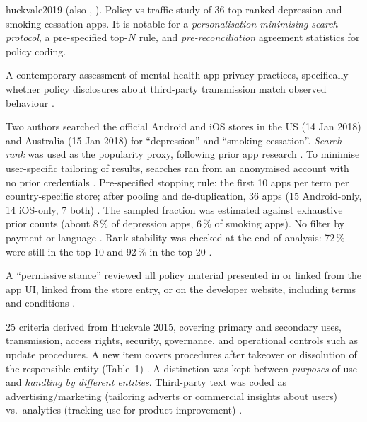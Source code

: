 \begin{papercard}{huckvale2019}
    (also , ). Policy-vs-traffic study of 36 top-ranked depression and smoking-cessation apps. It is notable for a \emph{personalisation-minimising search protocol}, a pre-specified top-$N$ rule, and \emph{pre-reconciliation} agreement statistics for policy coding.

 A contemporary assessment of mental-health app privacy practices, specifically whether policy disclosures about third-party transmission match observed behaviour .

 Two authors searched the official Android and iOS stores in the US (14 Jan 2018) and Australia (15 Jan 2018) for ``depression'' and ``smoking cessation''. \emph{Search rank} was used as the popularity proxy, following prior app research . To minimise user-specific tailoring of results, searches ran from an anonymised account with no prior credentials . Pre-specified stopping rule: the first 10 apps per term per country-specific store; after pooling and de-duplication, 36 apps (15 Android-only, 14 iOS-only, 7 both) . The sampled fraction was estimated against exhaustive prior counts (about 8\,\% of depression apps, 6\,\% of smoking apps). No filter by payment or language . Rank stability was checked at the end of analysis: 72\,\% were still in the top 10 and 92\,\% in the top 20 .

 A ``permissive stance'' reviewed all policy material presented in or linked from the app UI, linked from the store entry, or on the developer website, including terms and conditions .

 25 criteria derived from Huckvale 2015, covering primary and secondary uses, transmission, access rights, security, governance, and operational controls such as update procedures. A new item covers procedures after takeover or dissolution of the responsible entity (Table~1) . A distinction was kept between \emph{purposes} of use and \emph{handling by different entities}. Third-party text was coded as advertising/marketing (tailoring adverts or commercial insights about users) vs.\ analytics (tracking use for product improvement) .


\end{papercard}
